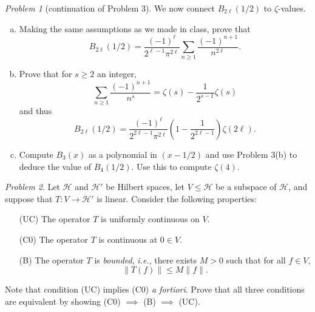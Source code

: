 \documentclass[11pt,twoside]{amsart}
\theoremstyle{plain}
\theoremstyle{remark}
\newtheorem{prob}{Problem}
\theoremstyle{definition}
\theoremstyle{definition}
\begin{document}

\begin{prob}[continuation of Problem 3]
We now connect $B_{2\ell}(1/2)$ to $\zeta$-values.
\begin{enumerate}[(a)]
\item Making the same assumptions as we made in class, prove that
\[
  B_{2\ell}(1/2) = \frac{(-1)^\ell}{2^{\ell-1}\pi^{2\ell}}\sum_{n\ge 1} \frac{(-1)^{n+1}}{n^{2\ell}}.
\]
\item Prove that for $s\ge 2$ an integer,
\[
  \sum_{n\ge 1}\frac{(-1)^{n+1}}{n^s} = \zeta(s)-\frac{1}{2^{s-1}}\zeta(s)
\]
and thus
\[
  B_{2\ell}(1/2) = \frac{(-1)^\ell}{2^{2\ell-1}\pi^{2\ell}}\left(1-\frac{1}{2^{2\ell-1}}\right)\zeta(2\ell).
\]
\item Compute $B_3(x)$ as a polynomial in $(x-1/2)$ and use Problem 3(b) to deduce the value of $B_4(1/2)$. Use this to compute $\zeta(4)$.
\end{enumerate}
\end{prob}


\begin{prob}
Let $\mathscr H$ and $\mathscr H'$ be Hilbert spaces, let $V\le \mathscr H$ be a subspace of $\mathscr H$, and suppose that $T\colon V\to \mathscr H'$ is linear. Consider the following properties:
\begin{itemize}
\item[(UC)] The operator $T$ is uniformly continuous on $V$.
\item[(C0)] The operator $T$ is continuous at $0\in V$.
\item[(B)] The operator $T$ is \emph{bounded}, \emph{i.e.}, there exists $M>0$ such that for all $f\in V$,
\[
  \| T(f) \| \le M\| f \|.
\]
\end{itemize}
Note that condition (UC) implies (C0) \emph{a fortiori}. Prove that all three conditions are equivalent by showing (C0) $\implies$ (B) $\implies$ (UC).
\end{prob}

\end{document}
